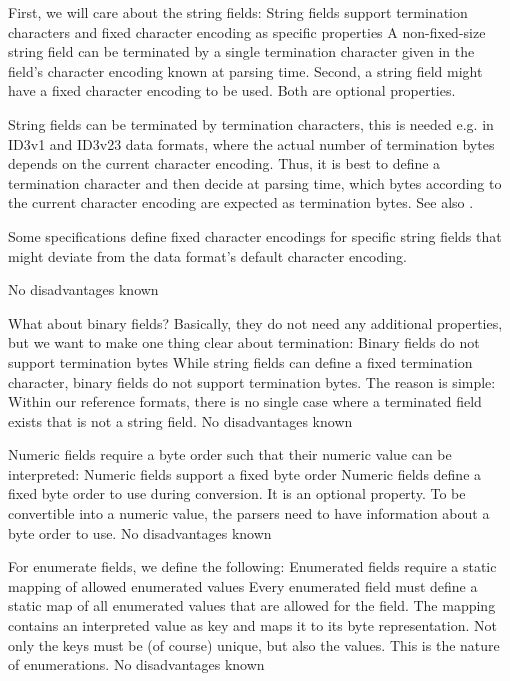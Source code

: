 First, we will care about the string fields:
{%
String fields support termination characters and fixed character encoding as specific properties
}
{%
A non-fixed-size string field can be terminated by a single termination character given in the field's character encoding known at parsing time. Second, a string field might have a fixed character encoding to be used. Both are optional properties.  
}
{%
String fields can be terminated by termination characters, this is needed e.g. in ID3v1 and ID3v23 data formats, where the actual number of termination bytes depends on the current character encoding. Thus, it is best to define a termination character and then decide at parsing time, which bytes according to the current character encoding are expected as termination bytes. See also .

Some specifications define fixed character encodings for specific string fields that might deviate from the data format's default character encoding.
}
{%
No disadvantages known
}

What about binary fields? Basically, they do not need any additional properties, but we want to make one thing clear about termination:
{%
Binary fields do not support termination bytes
}
{%
While string fields can define a fixed termination character, binary fields do not support termination bytes. 
}
{%
The reason is simple: Within our reference formats, there is no single case where a terminated field exists that is not a string field. 
}
{%
No disadvantages known
}

Numeric fields require a byte order such that their numeric value can be interpreted:
{%
Numeric fields support a fixed byte order
}
{%
Numeric fields define a fixed byte order to use during conversion. It is an optional property.
}
{%
To be convertible into a numeric value, the parsers need to have information about a byte order to use.
}
{%
No disadvantages known
}

For enumerate fields, we define the following:
{%
Enumerated fields require a static mapping of allowed enumerated values
}
{%
Every enumerated field must define a static map of all enumerated values that are allowed for the field. The mapping contains an interpreted value as key and maps it to its byte representation. Not only the keys must be (of course) unique, but also the values.
}
{%
This is the nature of enumerations.
}
{%
No disadvantages known
}

